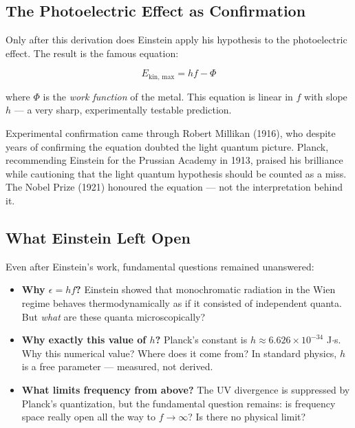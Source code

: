 \subsection{The Photoelectric Effect as Confirmation}

Only after this derivation does Einstein apply his hypothesis to the photoelectric 
effect. The result is the famous equation:

\begin{equation}
    E_{\text{kin, max}} = hf - \Phi
    \label{eq:photoelectric}
\end{equation}

where $\Phi$ is the \emph{work function} of the metal. This equation is linear in $f$ 
with slope $h$ — a very sharp, experimentally testable prediction.

Experimental confirmation came through Robert Millikan (1916), who despite years of 
confirming the equation doubted the light quantum picture. Planck, recommending 
Einstein for the Prussian Academy in 1913, praised his brilliance while cautioning 
that the light quantum hypothesis should be counted as a miss. The Nobel Prize (1921) 
honoured the equation — not the interpretation behind it.

\subsection{What Einstein Left Open}

Even after Einstein's work, fundamental questions remained unanswered:

\begin{itemize}
    \item \textbf{Why $\epsilon = hf$?} Einstein showed that monochromatic radiation 
    in the Wien regime behaves thermodynamically as if it consisted of independent 
    quanta. But \emph{what} are these quanta microscopically?
    
    \item \textbf{Why exactly this value of $h$?} Planck's constant is 
    $h \approx 6.626 \times 10^{-34}$ J$\cdot$s. Why this numerical value? 
    Where does it come from? In standard physics, $h$ is a free parameter — 
    measured, not derived.
    
    \item \textbf{What limits frequency from above?} The UV divergence is suppressed 
    by Planck's quantization, but the fundamental question remains: is frequency 
    space really open all the way to $f \to \infty$? Is there no physical limit?
\end{itemize}

